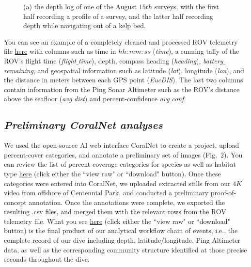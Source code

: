 \documentclass[11pt]{article}
\begin{document}
\begin{figure}[h!]
\centering
{}
\caption{
(a) the depth log of one of the August $15th$ surveys, with 
the first half recording a profile of a survey, and the latter half 
recording depth while navigating out of a kelp bed. 
}
\label{divelog}
\end{figure}

You can see an example of a completely cleaned and processed ROV 
telemetry file 
\href{https://github.com/zhrandell/Seattle_Aquarium_ROV_telemetry_imagery_analysis/blob/main/ROV_telemetry/Cleaned/2022-08-15_09-57-40.csv}{here}
 with columns such as time in $hh:mm:ss$ (\textit{time}), 
a running tally of the ROV's flight time (\textit{flight$\_$time}), 
depth, 
compass heading (\textit{heading}), 
\textit{battery$\_$remaining}, and 
geospatial information such as 
latitude (\textit{lat}),
longitude (\textit{lon}),
and the distance in meters between each GPS point (\textit{EucDIS}). 
The last two columns contain information from the Ping Sonar 
Altimeter such as the ROV's distance above the 
seafloor (\textit{avg$\_$dist}) and percent-confidence 
\textit{avg$\_$conf}. 

\subsection{\textit{Preliminary CoralNet analyses}}
We used the open-source AI web interface CoralNet to create a project, upload percent-cover categories, and annotate a preliminary set of images (Fig.~$2$). 
You can review the list of percent-coverage categories for species as well as habitat type 
\href{https://github.com/zhrandell/Seattle_Aquarium_ROV_telemetry_imagery_analysis/blob/main/documents/CoralNet_Percent_Cover_Classifications.xlsx}{here} (click either the ``view raw" or ``download" button).
Once these categories were entered into CoralNet, we uploaded extracted stills from our $4K$ video from offshore of Centennial Park, and conducted a preliminary proof-of-concept annotation.
Once the annotations were complete, we exported the resulting .csv files, and merged them with the relevant rows from the ROV telemetry file. 
What you see 
\href{https://github.com/zhrandell/Seattle_Aquarium_ROV_telemetry_imagery_analysis/blob/15b0c253a3292df240f1559ae9e0f73d25d6be66/ROV_telemetry/Cleaned/Telemetry_and_CoralNet.xlsx}{here} (click either the ``view raw" or ``download" button)
 is the final product of our analytical workflow chain of events, i.e., the complete record of our dive including depth, latitude/longitude, Ping Altimeter data, as well as the corresponding community structure identified at those precise seconds throughout the dive.  
\end{document}

